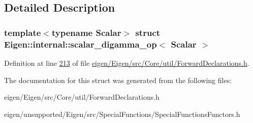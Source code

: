 \subsection{Detailed Description}
\subsubsection*{template$<$typename Scalar$>$\newline
struct Eigen\+::internal\+::scalar\+\_\+digamma\+\_\+op$<$ Scalar $>$}



Definition at line \hyperlink{eigen_2_eigen_2src_2_core_2util_2_forward_declarations_8h_source_l00213}{213} of file \hyperlink{eigen_2_eigen_2src_2_core_2util_2_forward_declarations_8h_source}{eigen/\+Eigen/src/\+Core/util/\+Forward\+Declarations.\+h}.



The documentation for this struct was generated from the following files\+:\begin{DoxyCompactItemize}
\item 
eigen/\+Eigen/src/\+Core/util/\+Forward\+Declarations.\+h\item 
eigen/unsupported/\+Eigen/src/\+Special\+Functions/\+Special\+Functions\+Functors.\+h\end{DoxyCompactItemize}
